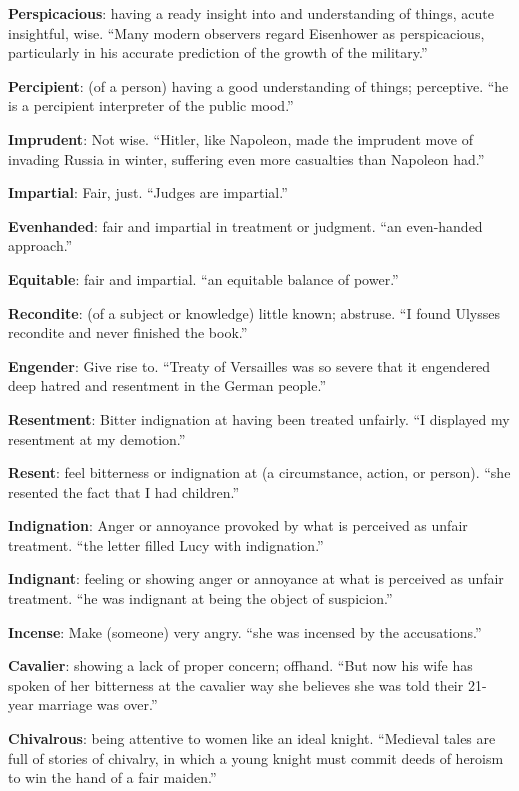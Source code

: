 \documentclass[12pt, a4paper]{ximera}
\begin{document}
\textbf{Perspicacious}: having a ready insight into and understanding of things, acute insightful, wise. ``Many modern observers regard Eisenhower as perspicacious, particularly in his accurate prediction of the growth of the military.''

\textbf{Percipient}: (of a person) having a good understanding of things; perceptive. ``he is a percipient interpreter of the public mood.''

\textbf{Imprudent}: Not wise. ``Hitler, like Napoleon, made the imprudent move of invading Russia in winter, suffering even more casualties than Napoleon had.''

\textbf{Impartial}: Fair, just. ``Judges are impartial.''

\textbf{Evenhanded}: fair and impartial in treatment or judgment. ``an even-handed approach.''

\textbf{Equitable}: fair and impartial. ``an equitable balance of power.''

\textbf{Recondite}: (of a subject or knowledge) little known; abstruse. ``I found Ulysses recondite and never finished the book.''

\textbf{Engender}: Give rise to. ``Treaty of Versailles was so severe that it engendered deep hatred and resentment in the German people.''

\textbf{Resentment}: Bitter indignation at having been treated unfairly. ``I displayed my resentment at my demotion.''

\textbf{Resent}: feel bitterness or indignation at (a circumstance, action, or person). ``she resented the fact that I had children.''

\textbf{Indignation}: Anger or annoyance provoked by what is perceived as unfair treatment. ``the letter filled Lucy with indignation.''

\textbf{Indignant}: feeling or showing anger or annoyance at what is perceived as unfair treatment. ``he was indignant at being the object of suspicion.''

\textbf{Incense}: Make (someone) very angry. ``she was incensed by the accusations.''

\textbf{Cavalier}: showing a lack of proper concern; offhand. ``But now his wife has spoken of her bitterness at the cavalier way she believes she was told their 21-year marriage was over.''

\textbf{Chivalrous}: being attentive to women like an ideal knight. ``Medieval tales are full of stories of chivalry, in which a young knight must commit deeds of heroism to win the hand of a fair maiden.''
\end{document}
